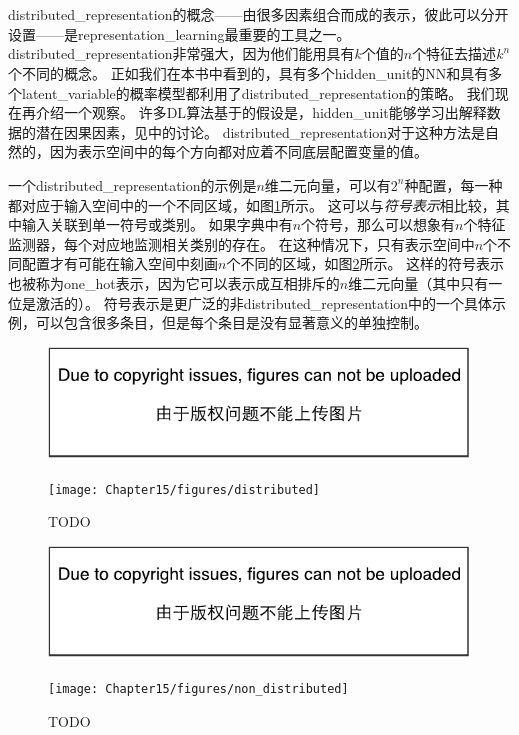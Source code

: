 
\section{}
\label{sec:distributed_representation}
\gls{distributed_representation}的概念——由很多因素组合而成的表示，彼此可以分开设置——是\gls{representation_learning}最重要的工具之一。
\gls{distributed_representation}非常强大，因为他们能用具有$k$个值的$n$个特征去描述$k^n$个不同的概念。
正如我们在本书中看到的，具有多个\gls{hidden_unit}的\gls{NN}和具有多个\gls{latent_variable}的概率模型都利用了\gls{distributed_representation}的策略。
我们现在再介绍一个观察。
许多\gls{DL}算法基于的假设是，\gls{hidden_unit}能够学习出解释数据的潜在因果因素，见中的讨论。
\gls{distributed_representation}对于这种方法是自然的，因为表示空间中的每个方向都对应着不同底层配置变量的值。


一个\gls{distributed_representation}的示例是$n$维二元向量，可以有$2^n$种配置，每一种都对应于输入空间中的一个不同区域，如图\ref{fig:chap15_distributed}所示。
这可以与\emph{符号表示}相比较，其中输入关联到单一符号或类别。
如果字典中有$n$个符号，那么可以想象有$n$个特征监测器，每个对应地监测相关类别的存在。
在这种情况下，只有表示空间中$n$个不同配置才有可能在输入空间中刻画$n$个不同的区域，如图\ref{fig:chap15_nondistributed}所示。
这样的符号表示也被称为\gls{one_hot}表示，因为它可以表示成互相排斥的$n$维二元向量（其中只有一位是激活的）。
符号表示是更广泛的非\gls{distributed_representation}中的一个具体示例，可以包含很多条目，但是每个条目是没有显著意义的单独控制。

\begin{figure}[!htb]
\ifOpenSource
\centerline{\includegraphics{figure.pdf}}
\else
\centerline{\texttt{[image: Chapter15/figures/distributed]}}
\fi
\caption{TODO}
\label{fig:chap15_distributed}
\end{figure}

\begin{figure}[!htb]
\ifOpenSource
\centerline{\includegraphics{figure.pdf}}
\else
\centerline{\texttt{[image: Chapter15/figures/non\_distributed]}}
\fi
\caption{TODO}
\label{fig:chap15_nondistributed}
\end{figure}

